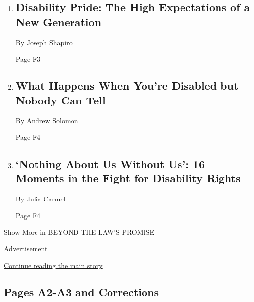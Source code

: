 \begin{enumerate}
\def\labelenumi{\arabic{enumi}.}
\item
  \href{/2020/07/17/style/americans-with-disabilities-act.html}{}

  \hypertarget{disability-pride-the-high-expectations-of-a-new-generation}{%
  \subsection{Disability Pride: The High Expectations of a New
  Generation}\label{disability-pride-the-high-expectations-of-a-new-generation}}

  By Joseph Shapiro

  Page F3
\item
  \href{/2020/07/10/style/invisible-disabilities.html}{}

  \hypertarget{what-happens-when-youre-disabled-but-nobody-can-tell}{%
  \subsection{What Happens When You're Disabled but Nobody Can
  Tell}\label{what-happens-when-youre-disabled-but-nobody-can-tell}}

  By Andrew Solomon

  Page F4
\item
  \href{/2020/07/22/us/ada-disabilities-act-history.html}{}

  \hypertarget{nothing-about-us-without-us-16-moments-in-the-fight-for-disability-rights}{%
  \subsection{`Nothing About Us Without Us': 16 Moments in the Fight for
  Disability
  Rights}\label{nothing-about-us-without-us-16-moments-in-the-fight-for-disability-rights}}

  By Julia Carmel

  Page F4
\end{enumerate}

Show More in BEYOND THE LAW'S PROMISE

Advertisement

\protect\hyperlink{after-mid9}{Continue reading the main story}

\hypertarget{pages-a2-a3-and-corrections}{%
\subsection{Pages A2-A3 and
Corrections}\label{pages-a2-a3-and-corrections}}

